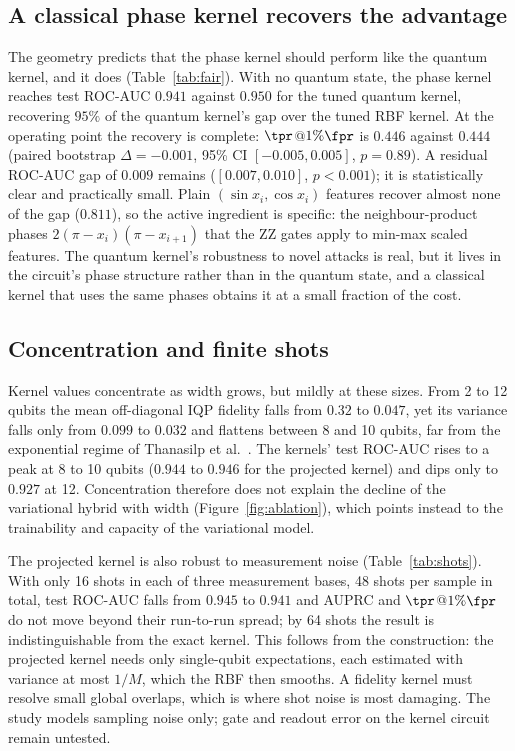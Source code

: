 \subsection{A classical phase kernel recovers the advantage}
The geometry predicts that the phase kernel should perform like the quantum kernel, and it does
(Table~\ref{tab:fair}). With no quantum state, the phase kernel reaches test ROC-AUC $0.941$ against
$0.950$ for the tuned quantum kernel, recovering $95\%$ of the quantum kernel's gap over the tuned RBF
kernel. At the operating point the recovery is complete: $\tpr$@$1\%\fpr$ is $0.446$ against $0.444$
(paired bootstrap $\Delta=-0.001$, 95\% CI $[-0.005,0.005]$, $p=0.89$). A residual ROC-AUC gap of $0.009$
remains ($[0.007,0.010]$, $p<0.001$); it is statistically clear and practically small. Plain
$(\sin x_i,\cos x_i)$ features recover almost none of the gap ($0.811$), so the active ingredient is
specific: the neighbour-product phases $2(\pi-x_i)(\pi-x_{i+1})$ that the ZZ gates apply to min-max
scaled features. The quantum kernel's robustness to novel attacks is real, but it lives in the circuit's
phase structure rather than in the quantum state, and a classical kernel that uses the same phases
obtains it at a small fraction of the cost.

\subsection{Concentration and finite shots}
Kernel values concentrate as width grows, but mildly at these sizes. From 2 to 12 qubits the mean
off-diagonal IQP fidelity falls from $0.32$ to $0.047$, yet its variance falls only from $0.099$ to
$0.032$ and flattens between 8 and 10 qubits, far from the exponential regime of Thanasilp
et al.~\cite{thanasilp2024concentration}. The kernels' test ROC-AUC rises to a peak at 8 to 10 qubits
($0.944$ to $0.946$ for the projected kernel) and dips only to $0.927$ at 12. Concentration therefore
does not explain the decline of the variational hybrid with width (Figure~\ref{fig:ablation}), which
points instead to the trainability and capacity of the variational model.

The projected kernel is also robust to measurement noise (Table~\ref{tab:shots}). With only 16 shots in
each of three measurement bases, 48 shots per sample in total, test ROC-AUC falls from $0.945$ to $0.941$
and AUPRC and $\tpr$@$1\%\fpr$ do not move beyond their run-to-run spread; by 64 shots the result is
indistinguishable from the exact kernel. This follows from the construction: the projected kernel needs
only single-qubit expectations, each estimated with variance at most $1/M$, which the RBF then smooths.
A fidelity kernel must resolve small global overlaps, which is where shot noise is most damaging. The
study models sampling noise only; gate and readout error on the kernel circuit remain untested.

